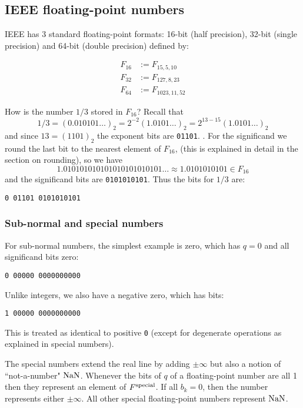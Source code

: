 \subsection{IEEE floating-point numbers}
\begin{definition}  IEEE has 3 standard floating-point formats: 16-bit (half precision), 32-bit (single precision) and 64-bit (double precision) defined by:


\begin{align*}
F_{16} &:= F_{15,5,10} \\
F_{32} &:= F_{127,8,23} \\
F_{64} &:= F_{1023,11,52}
\end{align*}
\end{definition}

\begin{example} How is the number $1/3$ stored in $F_{16}$? Recall that
\[
1/3 = (0.010101\ensuremath{\ldots})_2 = 2^{-2} (1.0101\ensuremath{\ldots})_2 = 2^{13-15} (1.0101\ensuremath{\ldots})_2
\]
and since $13 = (1101)_2$  the exponent bits are \texttt{01101}. .  For the significand we round the last bit to the nearest element of $F_{16}$, (this is explained in detail in the section on rounding), so we have
\[
1.010101010101010101010101\ensuremath{\ldots}\approx 1.0101010101 \in F_{16} 
\]
and the significand bits are \texttt{0101010101}. Thus the bits for $1/3$ are:

\begin{verbatim}
0 01101 0101010101
\end{verbatim}
\end{example}

\subsubsection{Sub-normal and special numbers}
For sub-normal numbers, the simplest example is zero, which has $q=0$ and all significand bits zero:

\begin{verbatim}
0 00000 0000000000
\end{verbatim}
Unlike integers, we also have a negative zero, which has bits:

\begin{verbatim}
1 00000 0000000000
\end{verbatim}
This is treated as identical to positive \texttt{0} (except for degenerate operations as explained in special numbers).

The special numbers extend the real line by adding $\ensuremath{\pm}\ensuremath{\infty}$ but also a notion of ``not-a-number" ${\rm NaN}$. Whenever the bits of $q$ of a floating-point number are all 1 then they represent an element of $F^{\rm special}$. If all $b_k=0$, then the number represents either $\ensuremath{\pm}\ensuremath{\infty}$. All other special floating-point numbers represent ${\rm NaN}$. 



